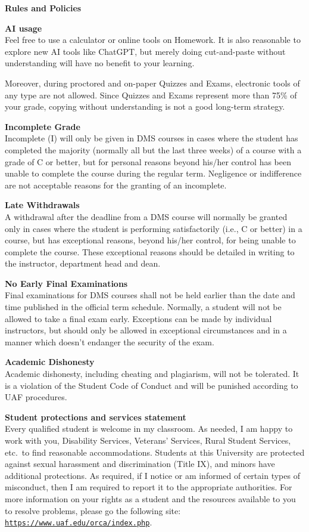 \documentclass[12pt]{article}
\renewcommand{\emph}[1]{\textsf{\textbf{#1}}}
\newcommand{\localhead}[1]{\par\smallskip\textbf{#1} \smallskip\nobreak\\}%
\def\heading#1{\localhead{\large\emph{#1}}}
\def\subheading#1{\localhead{\emph{#1}}}
\begin{document}
\heading{Rules and Policies}
\vskip -20pt

\subheading{AI usage}
Feel free to use a calculator or online tools on Homework.  It is also reasonable to explore new AI tools like ChatGPT, but merely doing cut-and-paste without understanding will have no benefit to your learning. 

Moreover, during proctored and on-paper Quizzes and Exams, electronic tools of any type are not allowed.  Since Quizzes and Exams represent more than 75\% of your grade, copying without understanding is not a good long-term strategy.

\subheading{Incomplete Grade} 
Incomplete (I) will only be given in
  DMS courses in cases where
  the student has completed the majority (normally all but the last
  three weeks) of a course with a grade of C or better, but for
  personal reasons beyond his/her control has been unable to complete
  the course during the regular term. Negligence or indifference are
  not acceptable reasons for the granting of an incomplete. 

\subheading{Late Withdrawals} 
A withdrawal after the deadline from a DMS course will
  normally be granted only in cases where the student is performing
  satisfactorily (i.e., C or better) in a course, but has exceptional
  reasons, beyond his/her control, for being unable to complete the
  course. These exceptional reasons should be detailed in writing to
  the instructor, department head and dean.

\subheading{No Early Final Examinations}
Final examinations for DMS
  courses shall not be held earlier than the date and time published
  in the official term schedule. Normally, a student will not be
  allowed to take a final exam early. Exceptions can be made by
  individual instructors, but should only be allowed in exceptional
  circumstances and in a manner which doesn't endanger the security of
  the exam.

\subheading{Academic Dishonesty}
Academic dishonesty, including cheating and plagiarism, will not
be tolerated.  It is a violation of the Student Code of Conduct
and will be punished according to UAF procedures.


\subheading{Student protections and services statement}
Every qualified student is welcome in my classroom.  As needed, I am happy to work with you, Disability Services, Veterans' Services, Rural Student Services, etc.~to find reasonable accommodations.  Students at this University are protected against sexual harassment and discrimination (Title IX), and minors have additional protections.  As required, if I notice or am informed of certain types of misconduct, then I am required to report it to the appropriate authorities.  For more information on your rights as a student and the resources available to you to resolve problems, please go the following site: \href{https://www.uaf.edu/orca/index.php}{\texttt{https://www.uaf.edu/orca/index.php}}.
\end{document}
